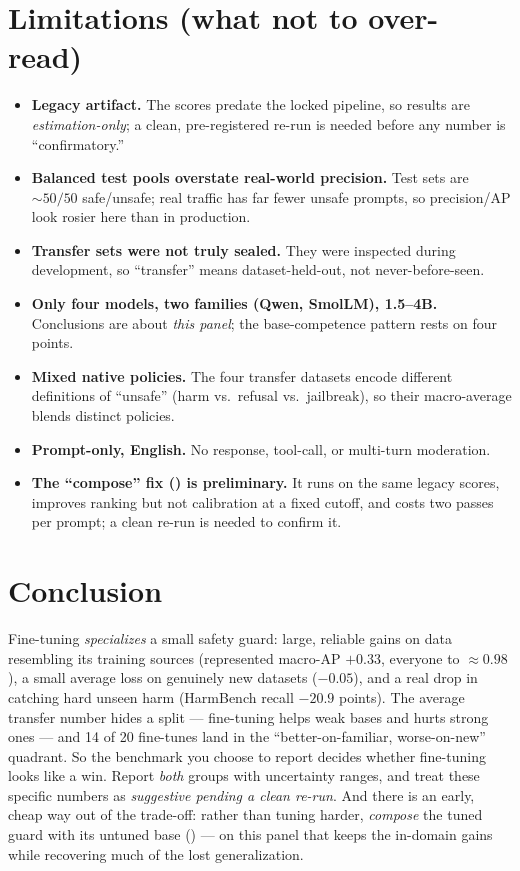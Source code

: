 \documentclass[11pt]{article}
\begin{document}
\section{Limitations (what not to over-read)}
\begin{itemize}
\item \textbf{Legacy artifact.} The scores predate the locked pipeline, so results are
\emph{estimation-only}; a clean, pre-registered re-run is needed before any number is
``confirmatory.''
\item \textbf{Balanced test pools overstate real-world precision.} Test sets are ${\sim}50/50$
safe/unsafe; real traffic has far fewer unsafe prompts, so precision/AP look rosier here than
in production.
\item \textbf{Transfer sets were not truly sealed.} They were inspected during development, so
``transfer'' means dataset-held-out, not never-before-seen.
\item \textbf{Only four models, two families (Qwen, SmolLM), 1.5--4B.} Conclusions are about
\emph{this panel}; the base-competence pattern rests on four points.
\item \textbf{Mixed native policies.} The four transfer datasets encode different definitions
of ``unsafe'' (harm vs.\ refusal vs.\ jailbreak), so their macro-average blends distinct
policies.
\item \textbf{Prompt-only, English.} No response, tool-call, or multi-turn moderation.
\item \textbf{The ``compose'' fix () is preliminary.} It runs on the same legacy
scores, improves ranking but not calibration at a fixed cutoff, and costs two passes per prompt;
a clean re-run is needed to confirm it.
\end{itemize}

\section{Conclusion}
Fine-tuning \emph{specializes} a small safety guard: large, reliable gains on data resembling
its training sources (represented macro-AP $+0.33$, everyone to ${\approx}0.98$), a small
average loss on genuinely new datasets ($-0.05$), and a real drop in catching hard unseen harm
(HarmBench recall $-20.9$ points). The average transfer number hides a split --- fine-tuning
helps weak bases and hurts strong ones --- and 14 of 20 fine-tunes land in the
``better-on-familiar, worse-on-new'' quadrant. So the benchmark you choose to report decides
whether fine-tuning looks like a win. Report \emph{both} groups with uncertainty ranges, and
treat these specific numbers as \emph{suggestive pending a clean re-run}. And there is an early,
cheap way out of the trade-off: rather than tuning harder, \emph{compose} the tuned guard with
its untuned base () --- on this panel that keeps the in-domain gains while
recovering much of the lost generalization.
\end{document}
